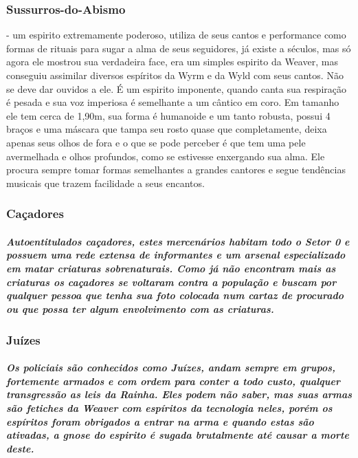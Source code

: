 \subsubsection{\bf Sussurros-do-Abismo} -  um espirito extremamente poderoso, utiliza de seus cantos e performance como formas de rituais para sugar a alma de seus seguidores, já existe a séculos, mas só agora ele mostrou sua verdadeira face, era um simples espirito da Weaver, mas conseguiu assimilar diversos espíritos da Wyrm e da Wyld com seus cantos. Não se deve dar ouvidos a ele. É um espirito imponente, quando canta sua respiração é pesada e sua voz imperiosa é semelhante a um cântico em coro. Em tamanho ele tem cerca de 1,90m, sua forma é humanoide e um tanto robusta, possui 4 braços e uma máscara que tampa seu rosto quase que completamente, deixa apenas seus olhos de fora e o que se pode perceber é que tem uma pele avermelhada e olhos profundos, como se estivesse enxergando sua alma. Ele procura sempre tomar formas semelhantes a grandes cantores e segue tendências musicais que trazem facilidade a seus encantos. 

\subsubsection{\bf Caçadores} 
\subparagraph*{Autoentitulados \textit{caçadores}, estes mercenários habitam todo o Setor 0 e possuem uma rede extensa de informantes e um arsenal especializado em matar criaturas sobrenaturais. Como já não encontram mais as criaturas os caçadores se voltaram contra a população e buscam por qualquer pessoa que tenha sua foto colocada num cartaz de procurado ou que possa ter algum envolvimento com as criaturas.}
\preencher

\subsubsection{\bf Juízes} 
\subparagraph*{Os policiais são conhecidos como Juízes, andam sempre em grupos, fortemente armados e com ordem para conter a todo custo, qualquer transgressão as leis da Rainha. Eles podem não saber, mas suas armas são fetiches da Weaver com espíritos da tecnologia neles, porém os espíritos foram obrigados a entrar na arma e quando estas são ativadas, a gnose do espirito é sugada brutalmente até causar a morte deste.}